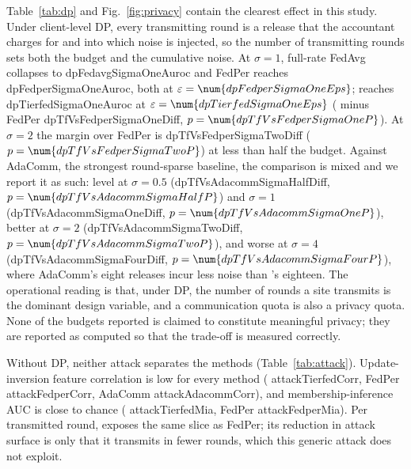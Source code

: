 Table~\ref{tab:dp} and Fig.~\ref{fig:privacy} contain the clearest effect in this study. Under client-level DP, every transmitting round is a release that the accountant charges for and into which noise is injected, so the number of transmitting rounds sets both the budget and the cumulative noise. At $\sigma=1$, full-rate FedAvg collapses to \num{dpFedavgSigmaOneAuroc} and FedPer reaches \num{dpFedperSigmaOneAuroc}, both at $\varepsilon=\num{dpFedperSigmaOneEps}$; \tierfed{} reaches \num{dpTierfedSigmaOneAuroc} at $\varepsilon=\num{dpTierfedSigmaOneEps}$ (\tierfed{} minus FedPer \num{dpTfVsFedperSigmaOneDiff}, $p=\num{dpTfVsFedperSigmaOneP}$). At $\sigma=2$ the margin over FedPer is \num{dpTfVsFedperSigmaTwoDiff} ($p=\num{dpTfVsFedperSigmaTwoP}$) at less than half the budget. Against AdaComm, the strongest round-sparse baseline, the comparison is mixed and we report it as such: level at $\sigma=0.5$ (\num{dpTfVsAdacommSigmaHalfDiff}, $p=\num{dpTfVsAdacommSigmaHalfP}$) and $\sigma=1$ (\num{dpTfVsAdacommSigmaOneDiff}, $p=\num{dpTfVsAdacommSigmaOneP}$), better at $\sigma=2$ (\num{dpTfVsAdacommSigmaTwoDiff}, $p=\num{dpTfVsAdacommSigmaTwoP}$), and worse at $\sigma=4$ (\num{dpTfVsAdacommSigmaFourDiff}, $p=\num{dpTfVsAdacommSigmaFourP}$), where AdaComm's eight releases incur less noise than \tierfed{}'s eighteen. The operational reading is that, under DP, the number of rounds a site transmits is the dominant design variable, and a communication quota is also a privacy quota. None of the budgets reported is claimed to constitute meaningful privacy; they are reported as computed so that the trade-off is measured correctly.

\begin{table}[t]
\caption{Attack surface (10 seeds): parameters exposed per transmitting round, update-inversion normalised error and feature correlation on the real transmitted slices, membership-inference AUC on the deployed models ($0.5$ = no leakage), and upload.}
\label{tab:attack}
\centering\small
{}
\end{table}

Without DP, neither attack separates the methods (Table~\ref{tab:attack}). Update-inversion feature correlation is low for every method (\tierfed{} \num{attackTierfedCorr}, FedPer \num{attackFedperCorr}, AdaComm \num{attackAdacommCorr}), and membership-inference AUC is close to chance (\tierfed{} \num{attackTierfedMia}, FedPer \num{attackFedperMia}). Per transmitted round, \tierfed{} exposes the same slice as FedPer; its reduction in attack surface is only that it transmits in fewer rounds, which this generic attack does not exploit.

